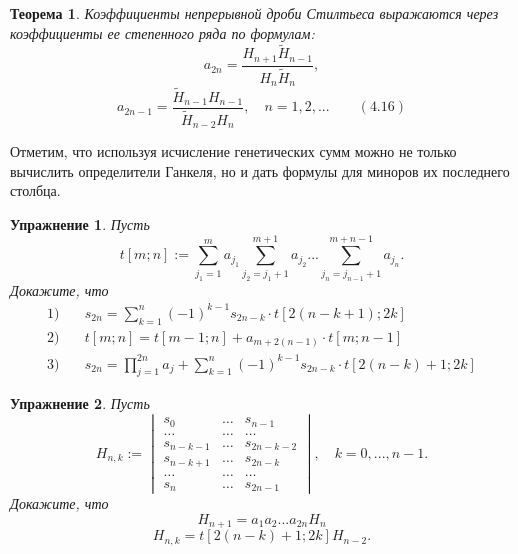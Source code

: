 \documentclass[12pt,a4paper]{article}
\theoremstyle{plain}   \newtheorem{Pro}{Задача}
\newtheorem{The}{Теорема}
\newtheorem{Exe}{Упражнение}
\begin{document}
\begin{The}
Коэффициенты непрерывной дроби Стилтьеса выражаются через
коэффициенты ее степенного ряда по формулам:
$$
  a_{2n}=\frac{H_{n+1}\tilde H_{n-1}}
    {H_n \tilde H_n},
$$
$$
  a_{2n-1}=\frac{\tilde H_{n-1}H_{n-1}}
    {\tilde H_{n-2}H_n},
	  \quad n=1,2,... \qquad (4.16)
$$
\end{The}
Отметим, что используя исчисление генетических сумм
можно не только вычислить определители Ганкеля, но и
дать формулы для миноров их последнего столбца.
\begin{Exe}
Пусть
\begin{equation*}
  t[m;n]:=
    \sum _{j_1 =1}^m a_{j_1}
	  \sum _{j_2 =j_1 +1}^{m+1}a_{j_2}...
	    \sum _{j_n =j_{n-1}+1}^{m+n-1}a_{j_n}.
\end{equation*}
Докажите, что
\begin{align*}
  1) & \quad
    s_{2n}=\sum _{k=1}^n (-1)^{k-1}s_{2n-k} \cdot
	  t[2(n-k+1);2k] \\
  2) & \quad
    t[m;n]=t[m-1;n]+a_{m+2(n-1)}
	  \cdot t[m;n-1] \\
  3) & \quad
    s_{2n}= \prod _{j=1}^{2n}a_j +
	  \sum _{k=1}^n (-1)^{k-1}s_{2n-k} \cdot
	    t[2(n-k)+1;2k]
\end{align*}
\end{Exe}
\begin{Exe}
Пусть
\begin{equation*}
  H_{n,k}:=
    \begin{vmatrix}
	  s_0 & \dots & s_{n-1} \\
	  \dots & \dots & \dots \\
	  s_{n-k-1} & \dots & s_{2n-k-2} \\
	  s_{n-k+1} & \dots & s_{2n-k} \\
	  \dots & \dots & \dots \\
	  s_n & \dots & s_{2n-1}
	\end{vmatrix}
  , \quad k=0,...,n-1.
\end{equation*}
Докажите, что
$$
  H_{n+1}=a_1 a_2 ...a_{2n} H_n
$$
$$
  H_{n,k}=t[2(n-k)+1;2k]H_{n-2}.
$$
\end{Exe}
\newpage
\end{document}
